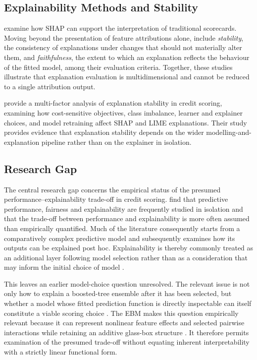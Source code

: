 \subsection{Explainability Methods and Stability}

\citet{hlongwaneNovelFrameworkEnhancing2024} examine how SHAP can support the
interpretation of traditional scorecards. Moving beyond the presentation of feature
attributions alone, \citet{amekoeExploringAccuracyInterpretability2024b} include
\emph{stability}, the consistency of explanations under changes that should not
materially alter them, and \emph{faithfulness}, the extent to which an explanation
reflects the behaviour of the fitted model, among their evaluation criteria. Together,
these studies illustrate that explanation evaluation is multidimensional and cannot
be reduced to a single attribution output.

\citet{ballegeerEvaluatingStabilityModel2025b} provide a multi-factor analysis of
explanation stability in credit scoring, examining how cost-sensitive objectives,
class imbalance, learner and explainer choices, and model retraining affect SHAP and
LIME explanations. Their study provides evidence that explanation stability depends
on the wider modelling-and-explanation pipeline rather than on the explainer in
isolation. 

\subsection{Research Gap}\label{sec:gap}

The central research gap concerns the empirical status of the presumed
performance--explainability trade-off in credit scoring. \citet{bahloolPerformanceFairnessExplainability2026} find that predictive
performance, fairness and explainability are frequently studied in isolation and
that the trade-off between performance and explainability is more often assumed
than empirically quantified. Much of the literature consequently starts from a
comparatively complex predictive model and subsequently examines how its outputs
can be explained post hoc. Explainability is thereby commonly treated
as an additional layer following model selection rather than as a consideration
that may inform the initial choice of model \citep{bahloolPerformanceFairnessExplainability2026}.

This leaves an earlier model-choice question unresolved. The relevant issue is not
only how to explain a boosted-tree ensemble after it has been selected, but whether
a model whose fitted prediction function is directly inspectable can itself
constitute a viable scoring choice
\citep[see][]{rudinStopExplainingBlack2019a}. The
EBM makes this question empirically relevant because it can represent nonlinear
feature effects and selected pairwise interactions while retaining an additive
glass-box structure
\citep{louAccurateIntelligibleModels2013,
noriInterpretMLUnifiedFramework2019}. It therefore permits examination of the
presumed trade-off without equating inherent interpretability with a strictly
linear functional form.


